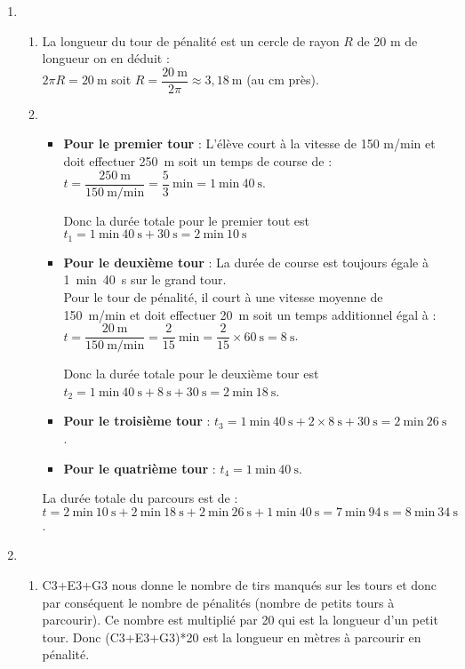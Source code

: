 \begin{enumerate}
	\item 
	\begin{enumerate}
		\item La longueur du tour de pénalité est un cercle de rayon $R$ de 20 m de longueur on en déduit : \\
			$2\pi R =20~\text{m}$ soit $R = \dfrac{20~\text{m}}{2\pi} \approx 3,18~\text{m}$ (au cm près).
		
		\item \begin{itemize}
			\item \textbf{Pour le premier tour} : L'élève court à la vitesse de 150 m/min et doit effectuer 250~m soit un temps de course de : $t=\dfrac{250~\text{m}}{150~\text{m/min}}=\dfrac{5}{3}~\text{min}=1~\text{min}~40~\text{s}$.
			
			\medskip
			Donc la durée totale pour le premier tout est $t_1 = 1~\text{min}~40~\text{s} + 30~\text{s}=2~\text{min}~10~\text{s}$
			
			\medskip
			\item \textbf{Pour le deuxième tour} : La durée de course est toujours égale à 1~min~40~s sur le grand tour.\\
			Pour le tour de pénalité, il court à une vitesse moyenne de 150~m/min et doit effectuer 20~m soit un temps additionnel égal à : $t=\dfrac{20~\text{m}}{150~\text{m/min}}=\dfrac{2}{15}~\text{min}=\dfrac{2}{15}\times60~\text{s}=8~\text{s}$.
			
			Donc la durée totale pour le deuxième tour est $t_2=1~\text{min}~40~\text{s}+8~\text{s}+30~\text{s}=2~\text{min}~18~\text{s}$.
			
			\medskip
			\item \textbf{Pour le troisième tour} : $t_3=1~\text{min}~40~\text{s} + 2 \times 8~\text{s}+30~\text{s}=2~\text{min}~26~\text{s}$.
			
			\item \textbf{Pour le quatrième tour} : $t_4 = 1~\text{min}~40~\text{s}$.
		\end{itemize}
		
		\medskip
		La durée totale du parcours est de : $t=2~\text{min}~10~\text{s} + 2~\text{min}~18~\text{s} + 2~\text{min}~26~\text{s} + 1~\text{min}~40~\text{s} = 7~\text{min}~94~\text{s}=8~\text{min}~34~\text{s}$.
		\end{enumerate}
		
		\item
		\begin{enumerate}
			\item C3+E3+G3 nous donne le nombre de tirs manqués sur les tours et donc par conséquent le nombre de pénalités (nombre de petits tours à parcourir). Ce nombre est multiplié par 20 qui est la longueur d'un petit tour. Donc (C3+E3+G3)*20 est la longueur en mètres à parcourir en pénalité.
			

\end{enumerate}
\end{enumerate}
